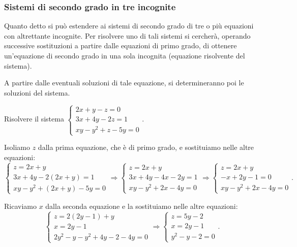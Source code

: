 \subsubsection{Sistemi di secondo grado in tre incognite}
Quanto detto si può estendere ai sistemi di secondo grado di tre o più equazioni con altrettante incognite. Per risolvere uno di tali sistemi si cercherà, operando successive sostituzioni a partire dalle equazioni di primo grado, di ottenere un'equazione di secondo grado in una sola incognita (equazione risolvente del sistema).

A partire dalle eventuali soluzioni di tale equazione, si determineranno poi le soluzioni del sistema.
\newpage
\begin{exrig}
\begin{esempio}
Risolvere il sistema \(\left\{\begin{array}{l}2x+y-z=0\\3x+4y-2z=1\\xy-y^2+z-5y=0\end{array}\right.\).

Isoliamo \( z \) dalla prima equazione, che è di primo grado, e sostituiamo nelle altre equazioni: 
\[ \left\{\begin{array}{l}z=2x+y\\
3x+4y-2(2x+y)=1\\
{xy}-y^2+(2x+y)-5y=0\end{array}\right. \Rightarrow\left\{\begin{array}{l}z=2x+y\\
3x+4y-4x-2y=1\\
xy-y^2+2x-4y=0\end{array}\right. \Rightarrow\left\{\begin{array}{l}z=2x+y\\
-x+2y-1=0\\
xy-y^2+2x-4y=0\end{array}\right..\]

Ricaviamo \( x \) dalla seconda equazione e la sostituiamo nelle altre equazioni: 
\[ \left\{\begin{array}{l}z=2(2y-1)+y\\
x=2y-1\\
2y^2-y-y^2+4y-2-4y=0\end{array}\right. \Rightarrow\left\{\begin{array}{l}z=5y-2\\
x=2y-1\\
y^2-y-2=0\end{array}\right..\]


\end{esempio}
\end{exrig}
